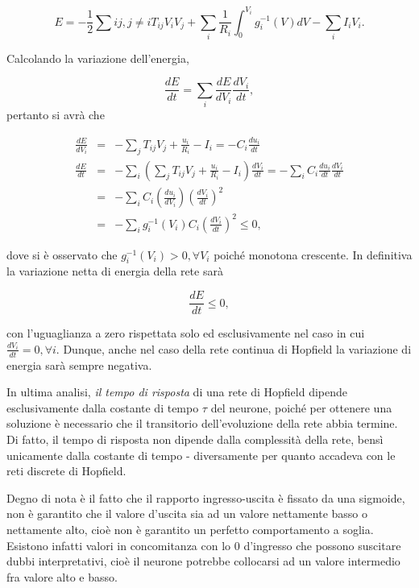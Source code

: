 \documentclass[10pt]{book}
\begin{document}
\begin{equation}
    E = -\frac 1 2 \sum{ij, j\neq i} T_{ij} V_i V_j + \sum_i \frac{1}{R_i}
    \int_0^{V_i} g_i^{-1} (V) dV - \sum_i I_i V_i.
\end{equation}

Calcolando la variazione dell'energia, 

$$ \frac{dE}{dt} = \sum_i \frac{dE}{dV_i} \frac{dV_i}{dt},$$ pertanto si avrà che

\begin{eqnarray}\nonumber
    \frac{dE}{dV_i} & = & -\sum_j T_{ij}V_j + \frac{u_i}{R_i} - I_i = -C_i\frac{du_i}{dt} \\\nonumber
    \frac{dE}{dt}   & = & -\sum_i \left(\sum_j T_{ij}V_j + \frac{u_i}{R_i} - I_i\right)\frac{dV_i}{dt} = -\sum_i C_i\frac{du_i}{dt}\frac{dV_i}{dt} \\\nonumber
                    & = & -\sum_i C_i(\frac{du_i}{dV_i})\left(\frac{dV_i}{dt}\right)^2 \\\nonumber
                    & = & -\sum_i g_i^{-1}(V_i)C_i\left(\frac{dV_i}{dt}\right)^2 \leq 0,
\end{eqnarray}

dove si è osservato che $g_i^{-1}(V_i) > 0, \forall V_i$ poiché monotona
crescente. In definitiva la variazione netta di energia della rete sarà

\begin{equation}
    \frac{dE}{dt} \leq 0,
\end{equation}

con l'uguaglianza a zero rispettata solo ed esclusivamente nel caso in cui
$\displaystyle \frac{dV_i}{dt} = 0, \forall i$. Dunque, anche nel caso della
rete continua di Hopfield la variazione di energia sarà sempre negativa.

In ultima analisi, \emph{il tempo di risposta} di una rete di Hopfield dipende
esclusivamente dalla costante di tempo $\tau$ del neurone, poiché per ottenere
una soluzione è necessario che il transitorio dell'evoluzione della rete abbia
termine. Di fatto, il tempo di risposta non dipende dalla complessità della
rete, bensì unicamente dalla costante di tempo \-- diversamente per quanto
accadeva con le reti discrete di Hopfield.

Degno di nota è il fatto che il rapporto ingresso-uscita è fissato da una
sigmoide, non è garantito che il valore d'uscita sia ad un valore nettamente
basso o nettamente alto, cioè non è garantito un perfetto comportamento a
soglia. Esistono infatti valori in concomitanza con lo $0$ d'ingresso che
possono suscitare dubbi interpretativi, cioè il neurone potrebbe collocarsi ad
un valore intermedio fra valore alto e basso. 
\end{document}
